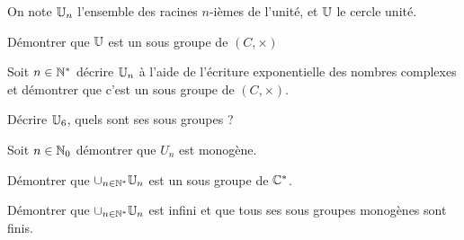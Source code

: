 \documentclass{report}
\begin{document}
\begin{exo}
    On note \(\mathbb{U}_n\) l'ensemble des racines \(n\)-ièmes de l'unité, et \(\mathbb{U}\) le cercle unité.
    \begin{q}{1}
        Démontrer que \(\mathbb{U}\) est un sous groupe de \(\left(C,\times\right)\)
    \end{q}
    \begin{q}{2}
        Soit \(n\in\mathbb{N}^*\) décrire \(\mathbb{U}_n\) à l'aide de l'écriture exponentielle
        des nombres complexes et démontrer que c'est un sous groupe de
        \(\left(C,\times\right)\).
    \end{q}
    \begin{q}{3}
        Décrire \(\mathbb{U}_6\), quels sont ses sous groupes ?
    \end{q}
    \begin{q}{4}
        Soit \(n\in\mathbb{N}_0\) démontrer que \(U_n\) est monogène.
    \end{q}
    \begin{q}{5}
        Démontrer que \(\cup_{n\in\mathbb{N}^*}\mathbb{U}_n\) est un sous groupe de \(\mathbb{C}^*\).
    \end{q}
    \begin{q}{6}
        Démontrer que \(\cup_{n\in\mathbb{N}^*}\mathbb{U}_n\) est infini et que tous ses sous groupes
        monogènes sont finis.
    \end{q}
\end{exo}
\end{document}
